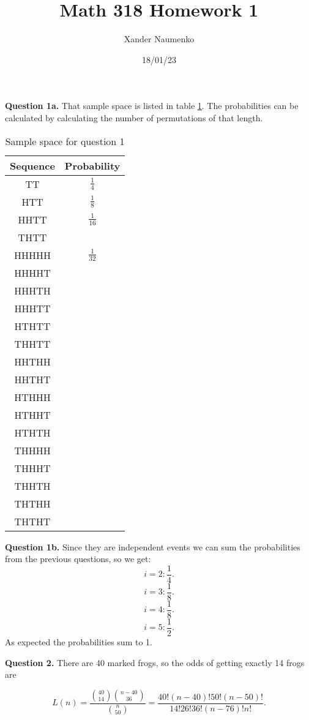 \documentclass[letterpaper, reqno,11pt]{article}
\begin{document}
\title{Math 318 Homework 1}
\date{18/01/23}
\author{Xander Naumenko}
\maketitle

{\noindent\bf Question 1a.} That sample space is listed in table \ref{tab:q1}. The probabilities can be calculated by calculating the number of permutations of that length. 

\begin{table}[htpb]
    \centering
    \caption{Sample space for question 1}
    \label{tab:q1}
    \begin{tabular}{c|c}
    Sequence&Probability\\
    \hline
    TT&$\frac{1}{4}$\\
    HTT&$\frac{1}{8}$\\
    HHTT&$\frac{1}{16}$\\
    THTT\\
    HHHHH&$\frac{1}{32}$\\
    HHHHT\\
    HHHTH\\
    HHHTT\\
    HTHTT\\
    THHTT\\
    HHTHH\\
    HHTHT\\
    HTHHH\\
    HTHHT\\
    HTHTH\\
    THHHH\\
    THHHT\\
    THHTH\\
    THTHH\\
    THTHT\\
    \end{tabular}
\end{table}

{\noindent\bf Question 1b.} Since they are independent events we can sum the probabilities from the previous questions, so we get: 
\[
i=2: \frac{1}{4}
.\]
\[
i=3: \frac{1}{8}
.\]
\[
i=4: \frac{1}{8}
.\]
\[
i=5: \frac{1}{2}
.\]
As expected the probabilities sum to 1. 

{\noindent\bf Question 2.} There are 40 marked frogs, so the odds of getting exactly 14 frogs are 

\[
    L(n)=\frac{{40\choose 14}{n-40\choose 36}}{{n\choose 50}}=\frac{40!(n-40)!50!(n-50)!}{14!26!36!(n-76)!n!}
.\]
\end{document}
